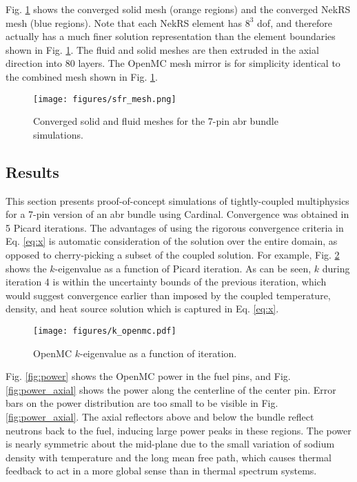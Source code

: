 \documentclass[3p,,preprint,11pt]{elsarticle}
\begin{document}
Fig. \ref{fig:sfr_mesh} shows the converged solid mesh (orange regions) and the converged NekRS mesh (blue regions). Note that each NekRS element has $8^3$ \gls{dof}, and therefore actually has a much finer solution representation than the element boundaries shown in Fig. \ref{fig:sfr_mesh}. The fluid and solid meshes are then extruded in the axial direction into 80 layers. The OpenMC mesh mirror is for simplicity identical to the combined mesh shown in Fig. \ref{fig:sfr_mesh}.

\begin{figure}[!htb]                                                                                                  
\centering
\texttt{[image: figures/sfr\_mesh.png]}
\caption{Converged solid and fluid meshes for the 7-pin \gls{abr} bundle simulations.}
\label{fig:sfr_mesh}
\end{figure}

\subsection{Results}
\label{sec:abr_results}

This section presents proof-of-concept simulations of tightly-coupled multiphysics for a 7-pin version of an \gls{abr} bundle using Cardinal.
Convergence was obtained in 5 Picard iterations. The advantages of using the rigorous convergence criteria in Eq. \eqref{eq:x} is automatic consideration of the solution over the entire domain, as opposed to cherry-picking a subset of the coupled solution. For example, Fig. \ref{fig:k} shows the $k$-eigenvalue as a function of Picard iteration. As can be seen, $k$ during iteration 4 is within the uncertainty bounds of the previous iteration, which would suggest convergence earlier than imposed by the coupled temperature, density, and heat source solution which is captured in Eq. \eqref{eq:x}.

\begin{figure}[!htb]                                                                                                  
\centering
\texttt{[image: figures/k\_openmc.pdf]}
\caption{OpenMC $k$-eigenvalue as a function of iteration.}
\label{fig:k}
\end{figure}

Fig. \ref{fig:power} shows the OpenMC power in the fuel pins, and Fig. \ref{fig:power_axial} shows the power along the centerline of the center pin. Error bars on the power distribution are too small to be visible in Fig. \ref{fig:power_axial}. The axial reflectors above and below the bundle reflect neutrons back to the fuel, inducing large power peaks in these regions. The power is nearly symmetric about the mid-plane due to the small variation of sodium density with temperature \cite{ma_2021} and the long mean free path, which causes thermal feedback to act in a more global sense than in thermal spectrum systems. 
\end{document}
